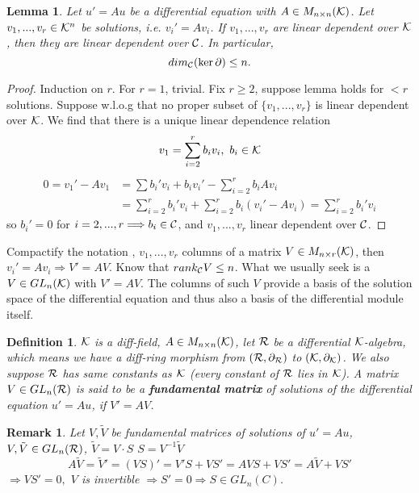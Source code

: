 \documentclass[11pt]{article}
\newtheorem{lemma}[thm]{Lemma}
\newtheorem{dfn}[thm]{Definition}
\newtheorem{rmk}[thm]{Remark}
\newcommand{\pd}{\partial}
\newcommand{\calc}{{\cal C}}
\newcommand{\calk}{{\cal K}}
\newcommand{\calr}{{\cal R}}
\begin{document}
\begin{lemma}\label{lem:basis}
Let $u'=A u$ be a differential equation with $A\in M_{n\times n}(\calk)$. Let $v_1,...,v_r\in \calk^n$ be solutions, i.e. $v_i'=A v_i$. If $v_1,...,v_r$ are linear dependent over $\calk$, then they are linear dependent over $\calc$. In particular,
$$
dim_{\calc}(\ker \pd)\leq n.
$$
\end{lemma}
\begin{proof}
Induction on $r$. For $r=1$, trivial. Fix $r\geq 2$, suppose lemma holds for $<r$ solutions. Suppose w.l.o.g that no proper subset of $\{v_1,...,v_r\}$ is linear dependent over $\calk$. We find that there is a unique linear dependence relation 
$$
v_1=\sum_{i=2}^r b_i v_i,\ b_i\in \calk
$$
$$
\begin{aligned}
0=v_1'-A v_1&=\sum b_i'v_i+b_i v_i' -\sum_{i=2}^r b_i A v_i\\
& =\sum^r_{i=2}b_i' v_i+\sum_{i=2}^r b_i(v_i'-A v_i)=\sum_{i=2}
^r b_i' v_i
\end{aligned}
$$
so $b_i'=0$ for $i=2,...,r\Longrightarrow b_i\in\calc$, and $v_1,...,v_r$ linear dependent over $\calc$.
\end{proof}
Compactify the notation , $v_1,...,v_r$ columns of a matrix $V\in M_{n\times r}(\calk)$, then $v_i'=A v_i\Longrightarrow V'=A V$. Know that $rank_\calc V\leq n$.
What we usually seek is a $V\in GL_n(\calk)$ with $V'=A V$. The columns of such $V $ provide a basis of the solution space of the differential equation and thus also a basis of the differential module itself.

\begin{dfn}
$\calk$ is a diff-field, $A\in M_{n\times n}(\calk)$, let $\calr$ be a differential $\calk$-algebra, which means we have a diff-ring morphism from $(\calr,\pd_\calr)$ to $(\calk,\pd_\calk)$. We also suppose $\calr$ has same constants as $\calk$ (every constant of $\calr$ lies in $\calk$).
A matrix $V\in GL_n(\calr)$ is said to be a \textbf{fundamental matrix} of solutions of the differential equation $u'=A u$, if $V'=A V$.
\end{dfn}
\begin{rmk}\label{rmk:fundamental_matrix}
Let $V,\tilde{V}$ be fundamental matrices of solutions of $u'=A u$, $V,\tilde{V}\in GL_{n}(\calr)$, $\tilde{V} =V\cdot S$ $S=V^{-1} \tilde{V}$
$$
A\tilde{V}=\tilde{V}'=(VS)'=V'S+V S'=A V S+V S'=A \tilde{V}+V S'
$$
$
\Longrightarrow V S'=0,
$
$V$ is invertible $\Longrightarrow S'=0\Longrightarrow S\in GL_n(C)$.
\end{rmk}
\end{document}
